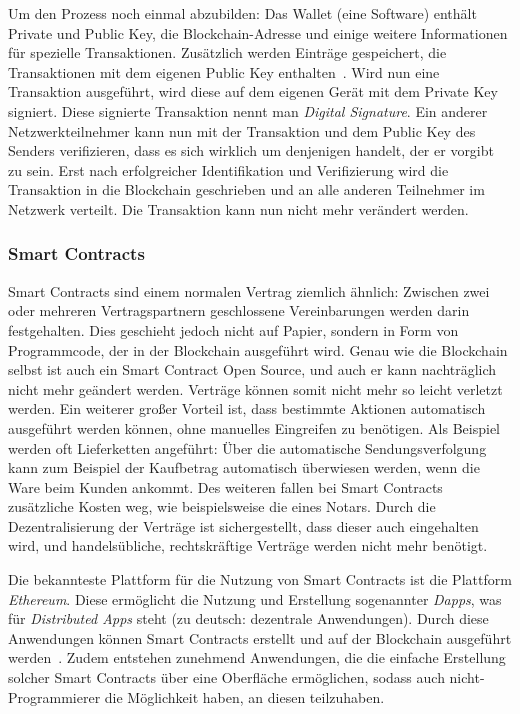 Um den Prozess noch einmal abzubilden: Das Wallet (eine Software) enthält Private und Public Key, die Blockchain-Adresse und einige weitere Informationen für spezielle Transaktionen. Zusätzlich werden Einträge gespeichert, die Transaktionen mit dem eigenen Public Key enthalten~\cite[S. 42]{Voshmgir.2019}.
Wird nun eine Transaktion ausgeführt, wird diese auf dem eigenen Gerät mit dem Private Key signiert. Diese signierte Transaktion nennt man \textit{Digital Signature}. Ein anderer Netzwerkteilnehmer kann nun mit der Transaktion und dem Public Key des Senders verifizieren, dass es sich wirklich um denjenigen handelt, der er vorgibt zu sein. Erst nach erfolgreicher Identifikation und Verifizierung wird die Transaktion in die Blockchain geschrieben und an alle anderen Teilnehmer im Netzwerk verteilt. Die Transaktion kann nun nicht mehr verändert werden.

\subsubsection{Smart Contracts}


Smart Contracts sind einem normalen Vertrag ziemlich ähnlich: Zwischen zwei oder mehreren Vertragspartnern geschlossene Vereinbarungen werden darin festgehalten. Dies geschieht jedoch nicht auf Papier, sondern in Form von Programmcode, der in der Blockchain ausgeführt wird. Genau wie die Blockchain selbst ist auch ein Smart Contract Open Source, und auch er kann nachträglich nicht mehr geändert werden. Verträge können somit nicht mehr so leicht verletzt werden. Ein weiterer großer Vorteil ist, dass bestimmte Aktionen automatisch ausgeführt werden können, ohne manuelles Eingreifen zu benötigen. 
Als Beispiel werden oft Lieferketten angeführt: Über die automatische Sendungsverfolgung kann zum Beispiel der Kaufbetrag automatisch überwiesen werden, wenn die Ware beim Kunden ankommt. 
Des weiteren fallen bei Smart Contracts zusätzliche Kosten weg, wie beispielsweise die eines Notars. 
Durch die Dezentralisierung der Verträge ist sichergestellt, dass dieser auch eingehalten wird, und handelsübliche, rechtskräftige Verträge werden nicht mehr benötigt.

Die bekannteste Plattform für die Nutzung von Smart Contracts ist die Plattform \textit{Ethereum}. Diese ermöglicht die Nutzung und Erstellung sogenannter \textit{Dapps}, was für \textit{Distributed Apps} steht (zu deutsch: dezentrale Anwendungen). Durch diese Anwendungen können Smart Contracts erstellt und auf der Blockchain ausgeführt werden~\cite{Ethereum.2019b}. Zudem entstehen zunehmend Anwendungen, die die einfache Erstellung solcher Smart Contracts über eine Oberfläche ermöglichen, sodass auch nicht-Programmierer die Möglichkeit haben, an diesen teilzuhaben.





